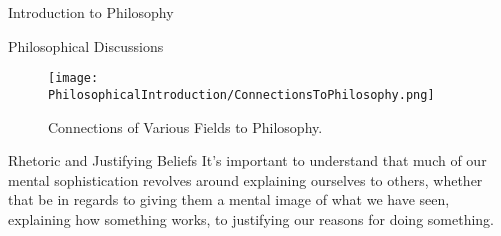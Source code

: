 \begin{chapter}{Introduction to Philosophy}
\begin{section}{Philosophical Discussions}
\begin{figure}[ht]
        \end{figure}
            
        \begin{figure}[H]
            \centering
            \texttt{[image: PhilosophicalIntroduction/ConnectionsToPhilosophy.png]}
            \caption{Connections of Various Fields to Philosophy.}
            \label{fig:ConnectionsToPhilosophy}
        \end{figure}
            
        \begin{subsection}{Rhetoric and Justifying Beliefs}
            It's important to understand that much of our mental sophistication revolves around explaining ourselves to others, whether that be in regards to giving them a mental image of what we have seen, explaining how something works, to justifying our reasons for doing something.
                

\end{subsection}
\end{section}
\end{chapter}
